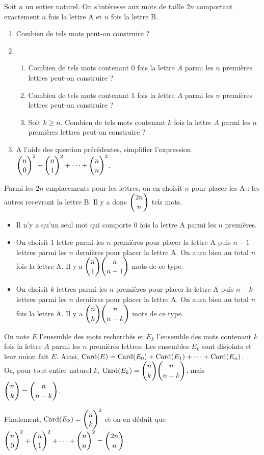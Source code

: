 \documentclass[11pt,fleqn, openany]{book} %
\begin{document}
\begin{exercise}[topic=comb04]Soit $n$ un entier naturel. On s'intéresse aux mots de taille $2n$ comportant exactement $n$ fois la lettre A et $n$ fois la lettre B.

\begin{enumerate}
\item Combien de tels mots peut-on construire ?
\item \begin{enumerate}
\item Combien de tels mots contenant 0 fois la lettre $A$ parmi les $n$ premières lettres peut-on construire ?
\item Combien de tels mots contenant 1 fois la lettre $A$ parmi les $n$ premières lettres peut-on construire ?
\item Soit $k\geqslant n$. Combien de tels mots contenant $k$ fois la lettre $A$ parmi les $n$ premières lettres peut-on construire ?
\end{enumerate}
\item A l'aide des question précédentes, simplifier l'expression $\dbinom{n}{0}^2+\dbinom{n}{1}^2+\dots+\dbinom{n}{n}^2$.
\end{enumerate}
\end{exercise}

\begin{solution}Parmi les $2n$ emplacements pour les lettres, on en choisit $n$ pour placer les A : les autres recevront la lettre B. Il y a donc $\dbinom{2n}{n}$ tels mots.

\begin{itemize}
\item Il n'y a qu'un seul mot qui comporte 0 fois la lettre A parmi les $n$ premières.
\item On choisit 1 lettre parmi les $n$ premières pour placer la lettre A puis $n-1$ lettres parmi les $n$ dernières pour placer la lettre A. On aura bien au total $n$ fois la lettre A. Il y a $\dbinom{n}{1}\dbinom{n}{n-1}$ mots de ce type.
\item On choisit $k$ lettres parmi les $n$ premières pour placer la lettre A puis $n-k$ lettres parmi les $n$ dernières pour placer la lettre A. On aura bien au total $n$ fois la lettre A. Il y a $\dbinom{n}{k}\dbinom{n}{n-k}$ mots de ce type.
\end{itemize}

On note $E$ l'ensemble des mots recherchés et $E_k$ l'ensemble des mots contenant $k$ fois la lettre $A$ parmi les $n$ premières lettres. Les ensembles $E_k$ sont disjoints et leur union fait $E$. Ainsi, $\mathrm{Card}(E)=\mathrm{Card}(E_0)+\mathrm{Card}(E_1)+\dots + \mathrm{Card}(E_n)$. \\Or, pour tout entier naturel $k$, $\mathrm{Card}(E_k)=\dbinom{n}{k}\dbinom{n}{n-k}$, mais $\dbinom{n}{k}=\dbinom{n}{n-k}$. 

Finalement, $\mathrm{Card}(E_k)=\dbinom{n}{k}^2$ et on en déduit que  $\dbinom{n}{0}^2+\dbinom{n}{1}^2+\dots+\dbinom{n}{n}^2=\dbinom{2n}{n}$.\end{solution}
\end{document}
